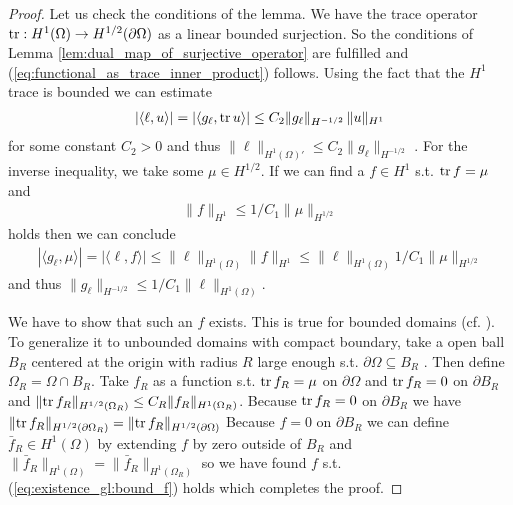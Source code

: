 \documentclass[../master_thesis.tex]{subfiles}
\begin{document}
\begin{proof}
    Let us check the conditions of the lemma. We have the trace operator 
    $\operatorname{tr}: H^1(\Omega) \rightarrow H^{1/2}(\partial \Omega)$ as a 
    linear bounded surjection. So the conditions of 
    Lemma \ref{lem:dual_map_of_surjective_operator} are fulfilled 
    and (\ref{eq:functional_as_trace_inner_product}) follows.
    Using the fact that the $H^1$ trace is bounded we can estimate 
    \begin{align*}
        |\langle \ell, u \rangle| = |\langle g_\ell, \operatorname{tr} u \rangle|
        \leq C_2 \lVert g_\ell \rVert _{H^{-1/2}} \, \lVert u \rVert _{H^1} 
    \end{align*}
    for some constant $C_2>0$
    and thus $\lVert \ell \rVert _{H^1(\Omega)'} \leq C_2 \lVert g_\ell \rVert _{H^{-1/2}}$ . 
    For the inverse inequality,
    we take some $\mu \in H^{1/2}$. If we can find a $f \in H^1$ s.t. $\operatorname{tr} f = \mu$ and 
    \begin{align}
        \lVert f \rVert _{H^1} \leq 1/C_1 \lVert \mu \rVert _{H^{1/2}}\label{eq:existence_gl:bound_f}
    \end{align}
    holds then we can conclude
    \begin{align*}
        |\langle g_\ell, \mu \rangle| = |\langle \ell, f \rangle|
        \leq \lVert \ell \rVert _{H^1(\Omega)} \lVert f \rVert _{H^1}
        \leq \lVert \ell \rVert _{H^1(\Omega)} 1/C_1 \lVert \mu \rVert _{H^{1/2}}
    \end{align*}
    and thus $\lVert g_\ell \rVert _{H^{-1/2}} \leq 1/C_1 \lVert \ell \rVert _{H^1(\Omega)}$.

    We have to show that such an $f$ exists. This is true for bounded domains (cf. \cite[Thm.\,3.10]{ern_guermond}).
    To generalize it to unbounded domains with compact boundary, take a open ball $B_R$ centered at the 
    origin with radius $R$ large enough s.t. $\partial \Omega \subseteq B_R$ . 
    Then define 
    $\Omega_R = \Omega \cap B_R$.
    Take $f_R$ as a function s.t. $\operatorname{tr} f_R = \mu$ on $\partial \Omega$ and 
    $\operatorname{tr} f_R = 0$ on $\partial B_R$ and $\lVert \operatorname{tr} f_R \rVert _{H^{1/2}(\Omega_R)}
    \leq C_R \lVert f_R \rVert _{H^1(\Omega_R)}$. Because $\operatorname{tr} f_R = 0$ on $\partial B_R$ 
    we have $\lVert \operatorname{tr} f_R \rVert _{H^{1/2}(\partial \Omega_R)} 
    = \lVert \operatorname{tr} f_R \rVert _{H^{1/2}(\partial \Omega)}$
    Because 
    $f= 0$ on $\partial B_R$ we can define $\bar{f}_R \in H^1(\Omega)$ by 
    extending $f$ by zero outside of $B_R$ and 
    $\lVert \bar{f}_R \rVert _{H^1(\Omega)} = \lVert \bar{f}_R \rVert _{H^1(\Omega_R)}$
    so we have found $f$ s.t. (\ref{eq:existence_gl:bound_f}) holds which completes the proof.
\end{proof}
\end{document}
